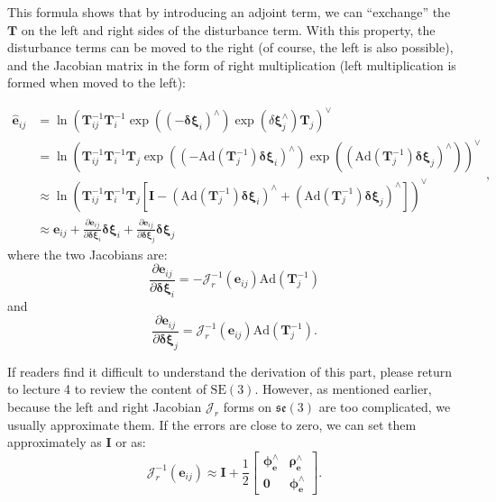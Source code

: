 This formula shows that by introducing an adjoint term, we can ``exchange'' the $\bm{T}$ on the left and right sides of the disturbance term. With this property, the disturbance terms can be moved to the right (of course, the left is also possible), and the Jacobian matrix in the form of right multiplication (left multiplication is formed when moved to the left):

\begin{equation}
	\begin{aligned}
		\hat{ \bm{e}}_{ij} &= \ln \left( \bm{T}_{ij}^{-1}  \bm{T}_i^{-1} \exp((-\bm{\delta \xi}_i)^\wedge) \exp(\delta \bm{\xi}_j^\wedge) \bm{T}_j  \right)^\vee\\
		&= \ln \left( \bm{T}_{ij}^{-1} \bm{T}_i^{-1} \bm{T}_j \exp \left( \left(- \mathrm{Ad}(\bm{T}_j^{-1}) \bm{\delta \xi}_i \right)^\wedge \right) \exp \left( \left( \mathrm{Ad}(\bm{T}_j^{-1})  \bm{\delta\xi}_j\right)^\wedge \right) \right)^\vee \\ 
		&\approx \ln \left( \bm{T}_{ij}^{-1} \bm{T}_i^{-1} \bm{T}_j \left[ \bm{I} - (\mathrm{Ad}(\bm{T}_j^{-1}) \bm{\delta \xi}_i)^\wedge + (\mathrm{Ad}(\bm{T}_j^{-1})  \bm{\delta \xi}_j)^{\wedge} \right] \right)^\vee \\
		& \approx \bm{e}_{ij} + \frac{\partial \bm{e}_{ij}}{\partial \bm{\delta \xi}_i} \bm{\delta \xi}_i + \frac{\partial \bm{e}_{ij}}{\partial \bm{\delta \xi}_j} \bm{\delta \xi}_j
	\end{aligned},
\end{equation}
where the two Jacobians are:
\begin{equation}
	\frac{\partial \bm{e}_{ij}}{\partial \bm{\delta \xi}_i} = - \bm{\mathcal{J}}_r^{-1}(\bm{e}_{ij}) \mathrm{Ad}(\bm{T}_j^{-1}) 
\end{equation}
and
\begin{equation}
	\frac{\partial \bm{e}_{ij}}{\partial \bm{\delta \xi}_j} = \bm{\mathcal{J}}_r^{-1}(\bm{e}_{ij}) \mathrm{Ad}(\bm{T}_j^{-1}).
\end{equation}

If readers find it difficult to understand the derivation of this part, please return to lecture 4 to review the content of $\mathrm{SE}(3)$. However, as mentioned earlier, because the left and right Jacobian $\bm{\mathcal{J}}_r$ forms on $\mathfrak{se}(3)$ are too complicated, we usually approximate them. If the errors are close to zero, we can set them approximately as $\bm{I}$ or as:
\begin{equation}
	\bm{\mathcal{J}}_r^{-1}(\bm{e}_{ij}) \approx \bm{I} + \frac{1}{2} 
	\left[ 
	{\begin{array}{*{20}{c}}
			{{\bm{\phi}_{\bm{e}} ^ \wedge }}&{{\bm{\rho}_{\bm{e}} ^ \wedge }}\\
			{\bm{0}}&{{\bm{\phi}_{\bm{e}} ^ \wedge }}
	\end{array}} 
	\right].
\end{equation}

